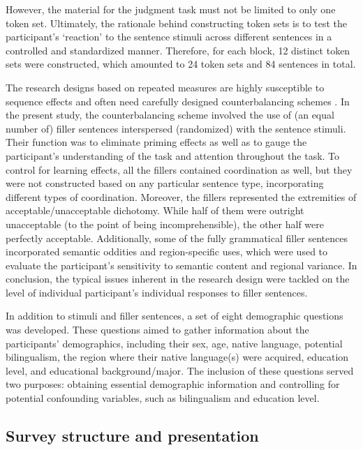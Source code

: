 \begin{sloppypar}
However, the material for the judgment task must not be limited to only one token set. Ultimately, the rationale behind constructing token sets is to test the participant's `reaction' to the sentence stimuli across different sentences in a controlled and standardized manner. Therefore, for each block, 12 distinct token sets were constructed, which amounted to 24 token sets and 84 sentences in total. 
\end{sloppypar}


The research designs based on repeated measures are highly susceptible to sequence effects and often need carefully designed counterbalancing schemes \citep[pp.\ 305--306]{grazianoandrauli}. In the present study, the counterbalancing scheme involved the use of (an equal number of) filler sentences interspersed (randomized) with the sentence stimuli. Their function was to eliminate priming effects as well as to gauge the participant's understanding of the task and attention throughout the task. To control for learning effects, all the fillers contained coordination as well, but they were not constructed based on any particular sentence type, incorporating different types of coordination. Moreover, the fillers represented the extremities of acceptable/unacceptable dichotomy. While half of them were outright unacceptable (to the point of being incomprehensible), the other half were perfectly acceptable. Additionally, some of the fully grammatical filler sentences incorporated semantic oddities and region-specific uses, which were used to evaluate the participant's sensitivity to semantic content and regional variance. In conclusion, the typical issues inherent in the research design were tackled on the level of individual participant's individual responses to filler sentences.

In addition to stimuli and filler sentences, a set of eight demographic questions was developed. These questions aimed to gather information about the participants' demographics, including their sex, age, native language, potential bilingualism, the region where their native language(s) were acquired, education level, and educational background/major. The inclusion of these questions served two purposes: obtaining essential demographic information and controlling for potential confounding variables, such as bilingualism and education level.

\subsection{Survey structure and presentation}

